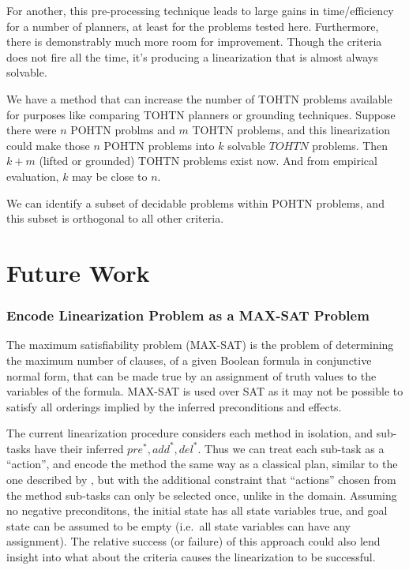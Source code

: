 \documentclass[letterpaper]{article} %
\newcommand{\PreS} {\ensuremath{\mathit{pre^{*}}}}
\newcommand{\AddS} {\ensuremath{\mathit{add^{*}}}}
\newcommand{\DelS} {\ensuremath{\mathit{del^{*}}}}
\begin{document}
For another, this pre-processing technique leads to large gains in time/efficiency for a number of planners, at least for the problems tested here. Furthermore, there is demonstrably much more room for improvement. Though the criteria does not fire all the time, it's producing a linearization that is almost always solvable.

We have a method that can increase the number of TOHTN problems available for purposes like comparing TOHTN planners or grounding techniques. Suppose there were $n$ POHTN problms and $m$ TOHTN problems, and this linearization could make those $n$ POHTN problems into $k$ solvable $TOHTN$ problems. Then $k+m$ (lifted or grounded) TOHTN problems exist now. And from empirical evaluation, $k$ may be close to $n$.

We can identify a subset of decidable problems within POHTN problems, and this subset is orthogonal to all other criteria.


\section{Future Work}


\subsubsection{Encode Linearization Problem as a MAX-SAT Problem} 
The maximum satisfiability problem (MAX-SAT) is the problem of determining the maximum number of clauses, of a given Boolean formula in conjunctive normal form, that can be made true by an assignment of truth values to the variables of the formula. MAX-SAT is used over SAT as it may not be possible to satisfy all orderings implied by the inferred preconditions and effects.

The current linearization procedure considers each method in isolation, and sub-tasks have their inferred $\PreS, \AddS, \DelS$. Thus we can treat each sub-task as a \enquote{action}, and encode the method the same way as a classical plan, similar to the one described by \cite{RINTANEN201245}, but with the additional constraint that \enquote{actions} chosen from the method sub-tasks can only be selected once, unlike in the domain. Assuming no negative preconditons, the initial state has all state variables true, and goal state can be assumed to be empty (i.e.\ all state variables can have any assignment). The relative success (or failure) of this approach could also lend insight into what about the criteria causes the linearization to be successful.
\end{document}
